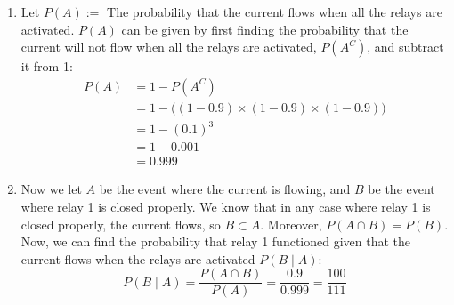 \documentclass{article}
\begin{document}
	\begin{sol}
		\begin{enumerate}
			\item Let $P(A) := $ The probability that the current flows when all the relays are activated. $P(A)$ can be given by first finding the probability that the current will not flow when all the relays are activated, $P(A^C)$, and subtract it from 1:
			\begin{align*}
				P(A) &= 1 - P(A^C)\\
				&= 1 - \big( (1-0.9) \times (1-0.9) \times (1-0.9) \big) \\
				&= 1 - (0.1)^3 \\
				&= 1 - 0.001 \\
				&= \boxed{0.999}
			\end{align*}
		
			\item Now we let $A$ be the event where the current is flowing, and $B$ be the event where relay 1 is closed properly. We know that in any case where relay 1 is closed properly, the current flows, so $B \subset A$. Moreover, $P(A \cap B) = P(B)$. Now, we can find the probability that relay 1 functioned given that the current flows when the relays are activated $P(B \mid A)$:
			$$ P(B \mid A) = \frac{P(A \cap B)}{P(A)} = \frac{0.9}{0.999} = \boxed{\frac{100}{111}}$$
		\end{enumerate}
	\end{sol}
\end{document}
